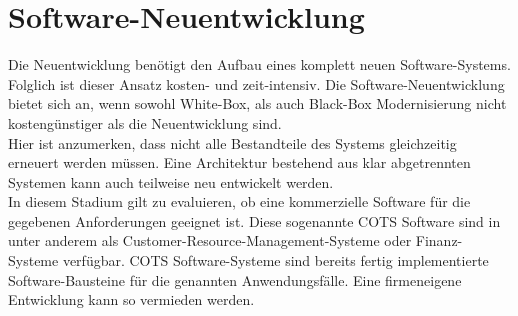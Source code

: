 \section{Software-Neuentwicklung}
Die Neuentwicklung benötigt den Aufbau eines komplett neuen Software-Systems. Folglich ist dieser Ansatz kosten- und zeit-intensiv. 
Die Software-Neuentwicklung bietet sich an, wenn sowohl White-Box, als auch Black-Box Modernisierung nicht kostengünstiger als die Neuentwicklung sind.\\
Hier ist anzumerken, dass nicht alle Bestandteile des Systems gleichzeitig erneuert werden müssen. Eine Architektur bestehend aus klar abgetrennten Systemen kann auch teilweise neu entwickelt werden. \\
In diesem Stadium gilt zu evaluieren, ob eine kommerzielle Software für die gegebenen Anforderungen geeignet ist. Diese sogenannte \ac{COTS} Software \cite{abts_cocots_2000} sind in unter anderem als Customer-Resource-Management-Systeme oder Finanz-Systeme verfügbar. 
\acs{COTS} Software-Systeme sind bereits fertig implementierte Software-Bausteine für die genannten Anwendungsfälle. Eine firmeneigene Entwicklung kann so vermieden werden. \cite{abts_cocots_2000}\cite{seacord_modernizing_2003}





